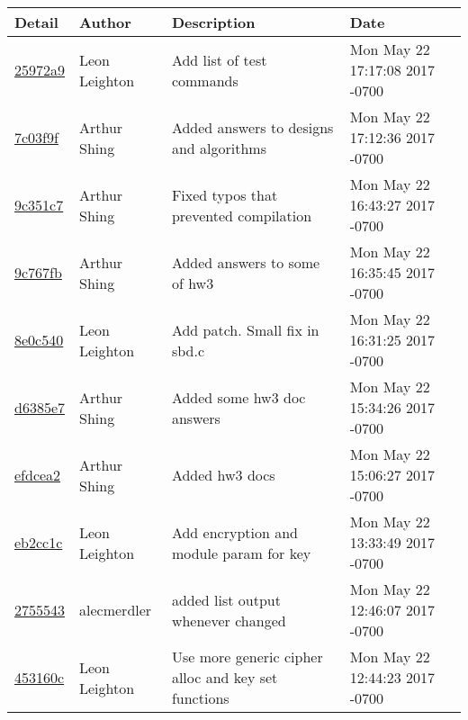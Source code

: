 \begin{tabular}{l l l l}\textbf{Detail} & \textbf{Author} & \textbf{Description} & \textbf{Date}\\\hline
\href{https://github.com/alecmerdler/cs-444-group-119/commit/25972a972b7a4b45a2ed5cb718097a2de43a6897}{25972a9} & Leon Leighton & Add list of test commands & Mon May 22 17:17:08 2017 -0700\\\hline
\href{https://github.com/alecmerdler/cs-444-group-119/commit/7c03f9fd9e1c762761414991f8f98c5e8ab2f1d2}{7c03f9f} & Arthur Shing & Added answers to designs and algorithms & Mon May 22 17:12:36 2017 -0700\\\hline
\href{https://github.com/alecmerdler/cs-444-group-119/commit/9c351c7025fec2b54b7ac732c82d8b4ccee463aa}{9c351c7} & Arthur Shing & Fixed typos that prevented compilation & Mon May 22 16:43:27 2017 -0700\\\hline
\href{https://github.com/alecmerdler/cs-444-group-119/commit/9c767fb23e4222d93544b8cfd3d80e13e2a0f5e6}{9c767fb} & Arthur Shing & Added answers to some of hw3 & Mon May 22 16:35:45 2017 -0700\\\hline
\href{https://github.com/alecmerdler/cs-444-group-119/commit/8e0c5406cc7e8aad17ca5f3f23579b7f8076a5d3}{8e0c540} & Leon Leighton & Add patch. Small fix in sbd.c & Mon May 22 16:31:25 2017 -0700\\\hline
\href{https://github.com/alecmerdler/cs-444-group-119/commit/d6385e74b4d9a135c8871d73aa8e8610ca35a50a}{d6385e7} & Arthur Shing & Added some hw3 doc answers & Mon May 22 15:34:26 2017 -0700\\\hline
\href{https://github.com/alecmerdler/cs-444-group-119/commit/efdcea237666de7dced78cf77315d4a591dfed53}{efdcea2} & Arthur Shing & Added hw3 docs & Mon May 22 15:06:27 2017 -0700\\\hline
\href{https://github.com/alecmerdler/cs-444-group-119/commit/eb2cc1c3d94c29dc80bbfee074ba5ca9f5eb5b0b}{eb2cc1c} & Leon Leighton & Add encryption and module param for key & Mon May 22 13:33:49 2017 -0700\\\hline
\href{https://github.com/alecmerdler/cs-444-group-119/commit/275554391545952a3b61ff2ea9d9374aa29f7ea6}{2755543} & alecmerdler & added list output whenever changed & Mon May 22 12:46:07 2017 -0700\\\hline
\href{https://github.com/alecmerdler/cs-444-group-119/commit/453160c46fa536405ce4924b9f8ddaeba5003eee}{453160c} & Leon Leighton & Use more generic cipher alloc and key set functions & Mon May 22 12:44:23 2017 -0700\\\hline

\end{tabular}
